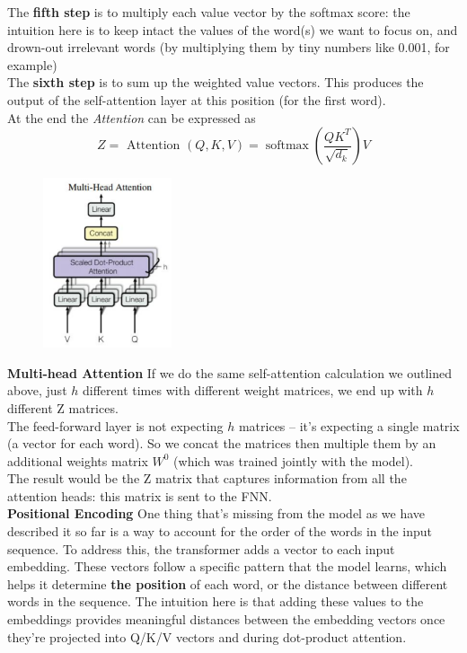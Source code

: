 The \textbf{fifth step} is to multiply each value vector by the softmax score: the intuition here is to keep intact the values of the word(s) we want to focus on, and drown-out irrelevant words (by multiplying them by tiny numbers like 0.001, for example) \\

The \textbf{sixth step} is to sum up the weighted value vectors. This produces the output of the self-attention layer at this position (for the first word). \\

At the end the \textit{Attention} can be expressed as $$ Z = 
\text { Attention }(Q, K, V)=\operatorname{softmax}\left(\frac{Q K^{T}}{\sqrt{d_{k}}}\right) V
$$

\begin{figure}
    \includegraphics[height=5cm]{images/multihead.png}
\end{figure}

\textbf{Multi-head Attention} If we do the same self-attention calculation we outlined above, just $h$ different times with different weight matrices, we end up with $h$ different Z matrices. \\
The feed-forward layer is not expecting $h$ matrices – it’s expecting a single matrix (a vector for each word). So we concat the matrices then multiple them by an additional weights matrix $W^0$ (which was trained jointly with the model). \\
The result would be the Z matrix that captures information from all the attention heads: this matrix is sent to the FNN.\\

\textbf{Positional Encoding} One thing that’s missing from the model as we have described it so far is a way to account for the order of the words in the input sequence. To address this, the transformer adds a vector to each input embedding. These vectors follow a specific pattern that the model learns, which helps it determine \textbf{the position} of each word, or the distance between different words in the sequence. The intuition here is that adding these values to the embeddings provides meaningful distances between the embedding vectors once they’re projected into Q/K/V vectors and during dot-product attention. \\ \\

